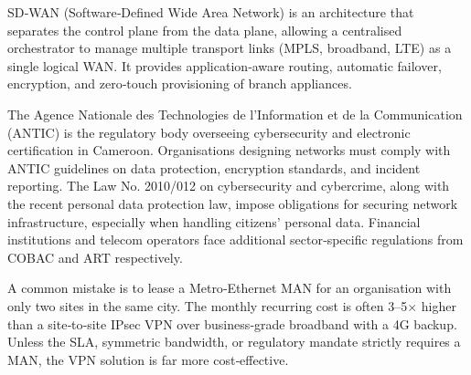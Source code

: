 \documentclass[11pt]{article}
\newcommand{\cle}[1]{{\popxbold\color{popdark}#1}}
\begin{document}
\begin{definition}[SD‑WAN]
\cle{SD‑WAN (Software‑Defined Wide Area Network)} is an architecture that separates the control plane from the data plane, allowing a centralised orchestrator to manage multiple transport links (MPLS, broadband, LTE) as a single logical WAN. It provides application‑aware routing, automatic failover, encryption, and zero‑touch provisioning of branch appliances.
\end{definition}

\begin{savaistu}
The \cle{Agence Nationale des Technologies de l'Information et de la Communication (ANTIC)} is the regulatory body overseeing cybersecurity and electronic certification in Cameroon. Organisations designing networks must comply with ANTIC guidelines on data protection, encryption standards, and incident reporting. The Law No. 2010/012 on cybersecurity and cybercrime, along with the recent personal data protection law, impose obligations for securing network infrastructure, especially when handling citizens' personal data. Financial institutions and telecom operators face additional sector‑specific regulations from COBAC and ART respectively.
\end{savaistu}

\begin{attention}
A common mistake is to lease a Metro‑Ethernet MAN for an organisation with only two sites in the same city. The monthly recurring cost is often 3–5$\times$ higher than a site‑to‑site IPsec VPN over business‑grade broadband with a 4G backup. Unless the SLA, symmetric bandwidth, or regulatory mandate strictly requires a MAN, the VPN solution is far more cost‑effective.
\end{attention}
\end{document}

